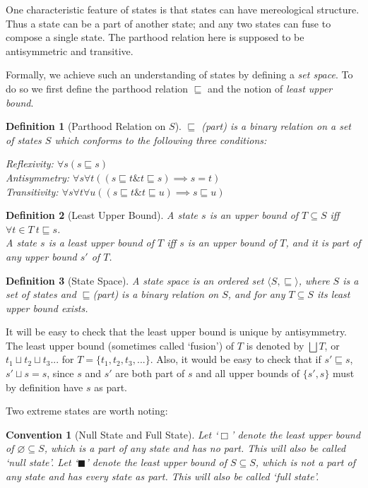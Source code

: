 \documentclass[12pt]{article}
\newtheorem{definition}{Definition}[section]
\newtheorem{convention}{Convention}[section]
\begin{document}
\par
One characteristic feature of states is that states can have mereological structure. Thus a state can be a part of another state; and any two states can fuse to compose a single state. The parthood relation here is supposed to be antisymmetric and transitive. 
\par
Formally, we achieve such an understanding of states by defining a \textit{set space}. To do so we first define the parthood relation $\sqsubseteq$ and the notion of \textit{least upper bound}.
\begin{definition}[Parthood Relation on $S$]
$\sqsubseteq$ (part) is a binary relation on a set of states $S$ which conforms to the following three conditions: \par
{\centering
Reflexivity: $\forall s (s \sqsubseteq s)$ \\
Antisymmetry: $\forall s \forall t ((s \sqsubseteq t \& t \sqsubseteq s) \implies s = t)$ \\
Transitivity: $\forall s \forall t \forall u ((s \sqsubseteq t \& t \sqsubseteq u) \implies s \sqsubseteq u)$ \\} 
\end{definition}
\begin{definition}[Least Upper Bound]
A state $s$ is an upper bound of $T \subseteq S$ iff $\forall t \! \in \! T \ t \sqsubseteq s$. \\
A state $s$ is a least upper bound of $T$ iff $s$ is an upper bound of $T$, and it is part of any upper bound $s'$ of $T$. 
\end{definition}
\begin{definition}[State Space]
A state space is an ordered set $\langle S, \sqsubseteq \rangle$, where $S$ is a set of states and $\sqsubseteq$(part) is a binary relation on $S$, and for any $T \subseteq S$ its least upper bound exists.
\end{definition}

It will be easy to check that the least upper bound is unique by antisymmetry. The least upper bound (sometimes called `fusion') of $T$ is denoted by $\bigsqcup T$, or $t_1 \sqcup t_2 \sqcup t_3 ...$ for $T = \{t_1, t_2, t_3, ...\}$. Also, it would be easy to check that if $s' \sqsubseteq s$, $s' \sqcup s = s$, since $s$ and $s'$ are both part of $s$ and all upper bounds of $\{s', s\}$ must by definition have $s$ as part. 
\par
Two extreme states are worth noting:
\begin{convention}[Null State and Full State]
Let `$\Box$' denote the least upper bound of $\varnothing \subseteq S$, which is a part of any state and has no part. This will also be called `null state'. Let `$\blacksquare$' denote the least upper bound of $S \subseteq S$, which is not a part of any state and has every state as part. This will also be called `full state'.
\end{convention}
\end{document}
